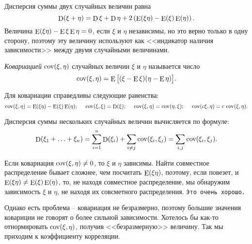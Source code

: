Дисперсия суммы двух случайных величин равна
\begin{equation*}
    \mathop{\mathrm{D}}\nolimits (\xi + \eta) = \mathop{\mathrm{D}}\nolimits \xi + \mathop{\mathrm{D}}\nolimits \eta + 2 \left(\mathop{\mathrm{E}}\nolimits(\xi \eta) - \mathop{\mathrm{E}}\nolimits (\xi) \mathop{\mathrm{E}}\nolimits (\eta)\right).
\end{equation*}
Величина $\mathop{\mathrm{E}}\nolimits (\xi \eta) - \mathop{\mathrm{E}}\nolimits \xi \mathop{\mathrm{E}}\nolimits \eta = 0$, если $\xi$ и $\eta$ независимы, но это верно только в одну сторону, поэтому эту величину используют как <<индикатор наличия зависимости>> между двумя случайными величинами. 

\begin{to_def}
    \textit{Ковариацией} $\mathop{\mathrm{cov}}\nolimits(\xi, \eta)$ случайных величин $\xi$ и $\eta$ называется число
    \begin{equation}
        \mathop{\mathrm{cov}}\nolimits (\xi, \eta) = \mathop{\mathrm{E}}\nolimits \big[(\xi-\mathop{\mathrm{E}}\nolimits \xi)(\eta - \mathop{\mathrm{E}}\nolimits \eta)\big].
    \end{equation}
\end{to_def} 

\noindent
Для ковариации справедливы следующие равенства:
\begin{equation*}
    \mathop{\mathrm{cov}}\nolimits(\xi ,\eta) = \mathop{\mathrm{E}}\nolimits (\xi \eta) - \mathop{\mathrm{E}}\nolimits (\xi) \mathop{\mathrm{E}}\nolimits (\eta);
    \hspace{5 mm}
    \mathop{\mathrm{cov}}\nolimits (\xi, \xi) = \mathop{\mathrm{D}}\nolimits (\xi);
    \hspace{5 mm}   
    \mathop{\mathrm{cov}}\nolimits(\xi, \eta) = \mathop{\mathrm{cov}}\nolimits(\eta, \xi);
    \hspace{5 mm}
    \mathop{\mathrm{cov}}\nolimits (c \xi, \eta) = c \, \mathop{\mathrm{cov}}\nolimits (\xi, \eta).
\end{equation*}

\begin{to_lem}
    Дисперсия суммы нескольких случайных величин вычисляется по формуле:
    \begin{equation}
        \mathop{\mathrm{D}}\nolimits (\xi_1 + \ldots + \xi_n) = 
        \sum_{i=1}^{n} \mathop{\mathrm{D}}\nolimits (\xi_i) + \sum_{i \neq j} \mathop{\mathrm{cov}}\nolimits (\xi_i, \xi_j) 
        =
        \sum_{i, j} \mathop{\mathrm{cov}}\nolimits(\xi_i, \xi_j).
    \end{equation}
\end{to_lem}

Если ковариация $\mathop{\mathrm{cov}}\nolimits (\xi, \eta) \neq 0$, то $\xi$ и $\eta$ зависимы. Найти совместное распределение бывает сложнее, чем посчитать $\mathop{\mathrm{E}}\nolimits (\xi \eta)$, поэтому, если повезет, и $\mathop{\mathrm{E}}\nolimits (\xi \eta) \neq \mathop{\mathrm{E}}\nolimits (\xi) \mathop{\mathrm{E}}\nolimits (\eta)$, то, не находя совместное распределение, мы обнаружим зависимость $\xi$ и $\eta$, не находя их совсметного распределения.
\texttt{Это очень хорошо.} 

Однако есть проблема -- ковариация не безразмерно, поэтому большие значения ковариции не говорят о более сильной зависимости. Хотелось бы как-то отнормировать $\mathop{\mathrm{cov}}\nolimits (\xi, \eta)$, получив <<безразмерную>> величину. Так мы приходим к коэффициенту корреляции. 

